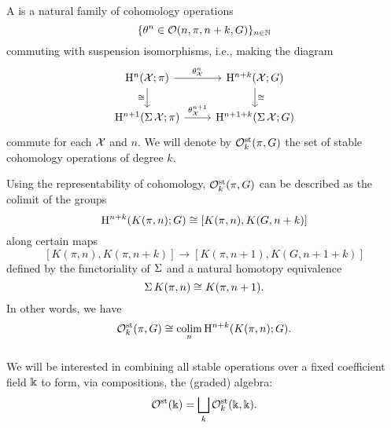\subsubsection{}

A  is a natural family of cohomology operations
\[
\{\theta^n \in \mathcal{O}(n,\pi,n+k,G)\}_{n \in \mathbb{N}}
\]
commuting with suspension isomorphisms, i.e., making the diagram
\[
\begin{tikzcd}
	\rH^n(\cX; \pi) \rar["\theta^n_\cX"] \dar["\cong" left] & \rH^{n+k}(\cX; G) \dar["\cong" right] \\
	\rH^{n+1}(\sus \cX; \pi) \rar["\theta^{n+1}_\cX"] & \rH^{n+1+k}(\sus \cX; G)
\end{tikzcd}
\]
commute for each \(\mathcal{X}\) and $n$.
We will denote by $\mathcal{O}^{\mathrm{st}}_k(\pi, G)$ the set of stable cohomology operations of degree $k$.


Using the representability of cohomology, $\mathcal{O}^{\mathrm{st}}_k(\pi, G)$ can be described as the colimit of the groups
\[
\mathrm{H}^{n+k}(K(\pi, n); G) \cong [K(\pi, n), K(G, n+k)]
\]
along certain maps
\[
[K(\pi, n), K(\pi, n+k)] \to [K(\pi, n+1), K(G, n+1+k)]
\]
defined by the functoriality of $\operatorname{\Sigma}$ and a natural homotopy equivalence
\begin{equation}\label{eq:suspension of K(pi,n)}
	\operatorname{\Sigma} K(\pi, n) \cong K(\pi, n+1).
\end{equation}
In other words, we have
\[
\mathcal{O}^{\mathrm{st}}_k(\pi, G) \cong \operatorname*{colim}_n \mathrm{H}^{n+k}(K(\pi, n); G).
\]

\subsubsection{} We will be interested in combining all stable operations over a fixed coefficient field $\Bbbk$ to form, via compositions, the (graded) algebra:
\[
\mathcal{O}^{\mathrm{st}}(\Bbbk) = \bigsqcup_k \mathcal{O}^{\mathrm{st}}_k(\Bbbk, \Bbbk).
\]

